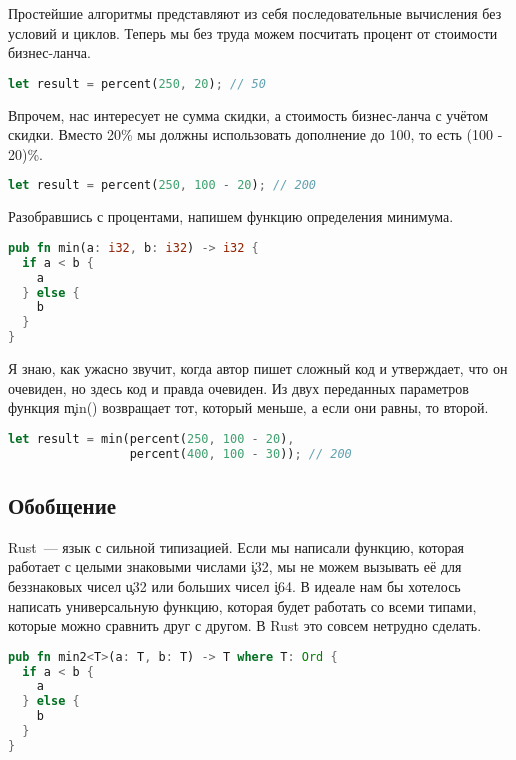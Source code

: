 Простейшие алгоритмы представляют из себя последовательные вычисления без условий и циклов.
Теперь мы без труда можем посчитать процент от стоимости бизнес-ланча.

\begin{lstlisting}[language=Rust]
let result = percent(250, 20); // 50
\end{lstlisting}


Впрочем, нас интересует не сумма скидки, а стоимость бизнес-ланча с учётом скидки.
Вместо 20\% мы должны использовать дополнение до 100, то есть (100 - 20)\%.

\begin{lstlisting}[language=Rust]
let result = percent(250, 100 - 20); // 200
\end{lstlisting}

Разобравшись с процентами, напишем функцию определения минимума.

\begin{lstlisting}[language=Rust]
pub fn min(a: i32, b: i32) -> i32 {
  if a < b {
    a
  } else {
    b
  }
}
\end{lstlisting}

Я знаю, как ужасно звучит, когда автор пишет сложный код и утверждает, что он очевиден, но здесь код и правда очевиден.
Из двух переданных параметров функция \c{min()} возвращает тот, который меньше, а если они равны, то второй.

\begin{lstlisting}[language=Rust]
let result = min(percent(250, 100 - 20),
                 percent(400, 100 - 30)); // 200
\end{lstlisting}

\subsection{Обобщение}

Rust~--- язык с сильной типизацией.
Если мы написали функцию, которая работает с целыми знаковыми числами \c{i32}, мы не можем вызывать её для беззнаковых чисел \c{u32} или больших чисел \c{i64}.
В идеале нам бы хотелось написать универсальную функцию, которая будет работать со всеми типами, которые можно сравнить друг с другом.
В Rust это совсем нетрудно сделать.

\begin{lstlisting}[language=Rust]
pub fn min2<T>(a: T, b: T) -> T where T: Ord {
  if a < b {
    a
  } else {
    b
  }
}
\end{lstlisting}

